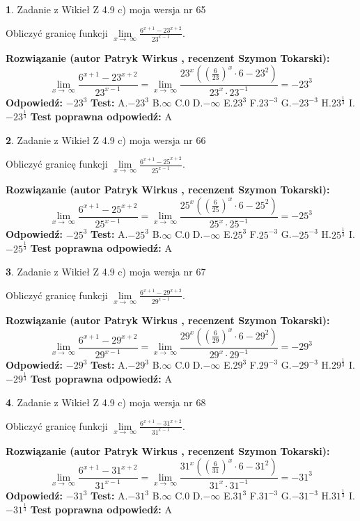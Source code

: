 \documentclass[12pt, a4paper]{article}
\theoremstyle{definition} %
\newtheorem{zad}{}
\newcommand{\zadStart}[1]{\begin{zad}#1\newline}
\newcommand{\zadStop}{\end{zad}}
\newcommand{\rozwStart}[2]{\noindent \textbf{Rozwiązanie (autor #1 , recenzent #2): }\newline}
\newcommand{\rozwStop}{\newline}
\newcommand{\odpStart}{\noindent \textbf{Odpowiedź:}\newline}
\newcommand{\odpStop}{\newline}
\newcommand{\testStart}{\noindent \textbf{Test:}\newline}
\newcommand{\testStop}{\newline}
\newcommand{\kluczStart}{\noindent \textbf{Test poprawna odpowiedź:}\newline}
\newcommand{\kluczStop}{\newline}
\begin{document}
\zadStart{Zadanie z Wikieł Z 4.9 c) moja wersja nr 65}


Obliczyć granicę funkcji  $\lim\limits_{x\to\ \infty}\frac{6^{x+1}-23^{x+2}}{23^{x-1}}$.
\zadStop
\rozwStart{Patryk Wirkus}{Szymon Tokarski}
$$\lim\limits_{x\to\ \infty}\frac{6^{x+1}-23^{x+2}}{23^{x-1}}=\lim\limits_{x\to\ \infty}\frac{23^{x}((\frac{6}{23})^{x}\cdot 6 -23^{2})}{23^{x}\cdot 23^{-1}} = -23^{3}$$
\rozwStop
\odpStart
$-23^{3}$
\odpStop
\testStart
A.$-23^{3}$ B.$\infty$ C.$0$ D.$-\infty$ E.$23^{3}$
F.$23^{-3}$ G.$-23^{-3}$
H.$23^{\frac{1}{3}}$
I.$-23^{\frac{1}{3}}$
\testStop
\kluczStart
A
\kluczStop



\zadStart{Zadanie z Wikieł Z 4.9 c) moja wersja nr 66}


Obliczyć granicę funkcji  $\lim\limits_{x\to\ \infty}\frac{6^{x+1}-25^{x+2}}{25^{x-1}}$.
\zadStop
\rozwStart{Patryk Wirkus}{Szymon Tokarski}
$$\lim\limits_{x\to\ \infty}\frac{6^{x+1}-25^{x+2}}{25^{x-1}}=\lim\limits_{x\to\ \infty}\frac{25^{x}((\frac{6}{25})^{x}\cdot 6 -25^{2})}{25^{x}\cdot 25^{-1}} = -25^{3}$$
\rozwStop
\odpStart
$-25^{3}$
\odpStop
\testStart
A.$-25^{3}$ B.$\infty$ C.$0$ D.$-\infty$ E.$25^{3}$
F.$25^{-3}$ G.$-25^{-3}$
H.$25^{\frac{1}{3}}$
I.$-25^{\frac{1}{3}}$
\testStop
\kluczStart
A
\kluczStop



\zadStart{Zadanie z Wikieł Z 4.9 c) moja wersja nr 67}


Obliczyć granicę funkcji  $\lim\limits_{x\to\ \infty}\frac{6^{x+1}-29^{x+2}}{29^{x-1}}$.
\zadStop
\rozwStart{Patryk Wirkus}{Szymon Tokarski}
$$\lim\limits_{x\to\ \infty}\frac{6^{x+1}-29^{x+2}}{29^{x-1}}=\lim\limits_{x\to\ \infty}\frac{29^{x}((\frac{6}{29})^{x}\cdot 6 -29^{2})}{29^{x}\cdot 29^{-1}} = -29^{3}$$
\rozwStop
\odpStart
$-29^{3}$
\odpStop
\testStart
A.$-29^{3}$ B.$\infty$ C.$0$ D.$-\infty$ E.$29^{3}$
F.$29^{-3}$ G.$-29^{-3}$
H.$29^{\frac{1}{3}}$
I.$-29^{\frac{1}{3}}$
\testStop
\kluczStart
A
\kluczStop



\zadStart{Zadanie z Wikieł Z 4.9 c) moja wersja nr 68}


Obliczyć granicę funkcji  $\lim\limits_{x\to\ \infty}\frac{6^{x+1}-31^{x+2}}{31^{x-1}}$.
\zadStop
\rozwStart{Patryk Wirkus}{Szymon Tokarski}
$$\lim\limits_{x\to\ \infty}\frac{6^{x+1}-31^{x+2}}{31^{x-1}}=\lim\limits_{x\to\ \infty}\frac{31^{x}((\frac{6}{31})^{x}\cdot 6 -31^{2})}{31^{x}\cdot 31^{-1}} = -31^{3}$$
\rozwStop
\odpStart
$-31^{3}$
\odpStop
\testStart
A.$-31^{3}$ B.$\infty$ C.$0$ D.$-\infty$ E.$31^{3}$
F.$31^{-3}$ G.$-31^{-3}$
H.$31^{\frac{1}{3}}$
I.$-31^{\frac{1}{3}}$
\testStop
\kluczStart
A
\kluczStop
\end{document}
